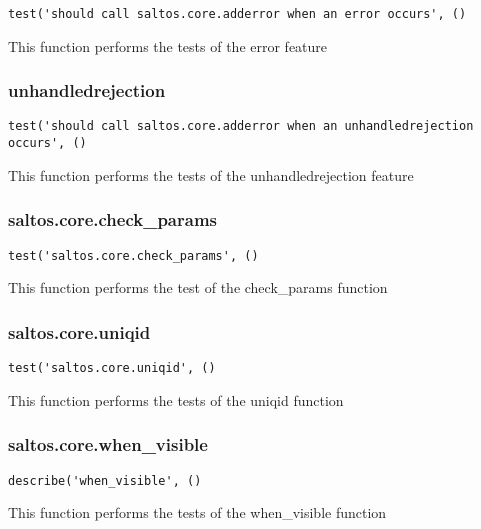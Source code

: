 \documentclass[a4paper]{article}
\begin{document}
\begin{lstlisting}
test('should call saltos.core.adderror when an error occurs', ()
\end{lstlisting}

This function performs the tests of the error feature

\hypertarget{toc490}{}
\subsubsection{unhandledrejection}

\begin{lstlisting}
test('should call saltos.core.adderror when an unhandledrejection occurs', ()
\end{lstlisting}

This function performs the tests of the unhandledrejection feature

\hypertarget{toc491}{}
\subsubsection{saltos.core.check\_params}

\begin{lstlisting}
test('saltos.core.check_params', ()
\end{lstlisting}

This function performs the test of the check\_params function

\hypertarget{toc492}{}
\subsubsection{saltos.core.uniqid}

\begin{lstlisting}
test('saltos.core.uniqid', ()
\end{lstlisting}

This function performs the tests of the uniqid function

\hypertarget{toc493}{}
\subsubsection{saltos.core.when\_visible}

\begin{lstlisting}
describe('when_visible', ()
\end{lstlisting}

This function performs the tests of the when\_visible function

\hypertarget{toc494}{}
\end{document}
